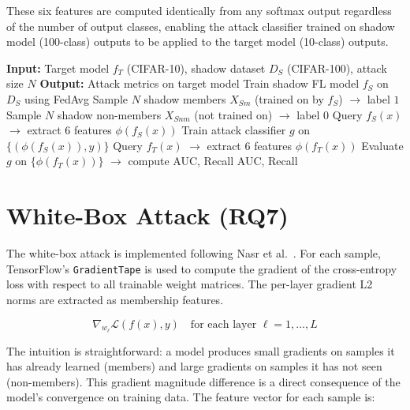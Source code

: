 \documentclass[12pt, a4paper]{report}
\begin{document}
These six features are computed identically from any softmax output regardless
of the number of output classes, enabling the attack classifier trained on shadow
model (100-class) outputs to be applied to the target model (10-class) outputs.

\begin{algorithm}[H]
\caption{Shadow Model Membership Inference Attack}
\label{alg:shadow}
\begin{algorithmic}[1]
\State \textbf{Input:} Target model $f_T$ (CIFAR-10), shadow dataset $D_S$ (CIFAR-100), attack size $N$
\State \textbf{Output:} Attack metrics on target model
\State Train shadow FL model $f_S$ on $D_S$ using FedAvg
\State Sample $N$ shadow members $X_{Sm}$ (trained on by $f_S$) $\rightarrow$ label $1$
\State Sample $N$ shadow non-members $X_{Snm}$ (not trained on) $\rightarrow$ label $0$
    \State Query $f_S(x)$ $\rightarrow$ extract 6 features $\phi(f_S(x))$
\EndFor
\State Train attack classifier $g$ on $\{(\phi(f_S(x)), y)\}$
    \State Query $f_T(x)$ $\rightarrow$ extract 6 features $\phi(f_T(x))$
\EndFor
\State Evaluate $g$ on $\{\phi(f_T(x))\}$ $\rightarrow$ compute AUC, Recall
\State \Return AUC, Recall
\end{algorithmic}
\end{algorithm}

\section{White-Box Attack (RQ7)}

The white-box attack is implemented following Nasr et al.~\cite{nasr2019comprehensive}.
For each sample, TensorFlow's \texttt{GradientTape} is used to compute the
gradient of the cross-entropy loss with respect to all trainable weight matrices.
The per-layer gradient L2 norms are extracted as membership features.

\begin{equation}
  \nabla_{w_\ell} \mathcal{L}(f(x), y) \quad \text{for each layer } \ell = 1, \ldots, L
\end{equation}

The intuition is straightforward: a model produces small gradients on samples it
has already learned (members) and large gradients on samples it has not seen
(non-members). This gradient magnitude difference is a direct consequence of the
model's convergence on training data. The feature vector for each sample is:
\end{document}
